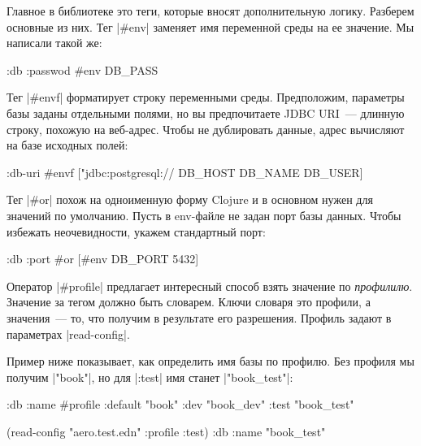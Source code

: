 Главное в библиотеке это теги, которые вносят дополнительную логику. Разберем
основные из них. Тег \spverb|#env| заменяет имя переменной среды на ее
значение. Мы написали такой же:

\begin{english}
  \begin{clojure}
{:db {:passwod #env DB_PASS}}
  \end{clojure}
\end{english}

Тег \spverb|#envf| форматирует строку переменными среды. Предположим, параметры
базы заданы отдельными полями, но вы предпочитаете JDBC URI~--- длинную строку,
похожую на веб-адрес. Чтобы не дублировать данные, адрес вычисляют на базе
исходных полей:

\begin{english}
  \begin{clojure}
{:db-uri #envf ["jdbc:postgresql://%
                DB_HOST DB_NAME DB_USER]}
  \end{clojure}
\end{english}

Тег \spverb|#or| похож на одноименную форму Clojure и в основном нужен для
значений по умолчанию. Пусть в env-файле не задан порт базы данных. Чтобы
избежать неочевидности, укажем стандартный порт:

\begin{english}
  \begin{clojure}
{:db {:port #or [#env DB_PORT 5432]}}
  \end{clojure}
\end{english}

Оператор \spverb|#profile| предлагает интересный способ взять значение по
\emph{профилилю}. Значение за тегом должно быть словарем. Ключи словаря это
профили, а значения~--- то, что получим в результате его разрешения. Профиль
задают в параметрах \spverb|read-config|.

Пример ниже показывает, как определить имя базы по профилю. Без профиля мы
получим \spverb|"book"|, но для \spverb|:test| имя станет \spverb|"book_test"|:

\begin{english}
  \begin{clojure}
{:db {:name #profile {:default "book"
                      :dev     "book_dev"
                      :test    "book_test"}}}

(read-config "aero.test.edn" {:profile :test})
{:db {:name "book_test"}}
  \end{clojure}
\end{english}

